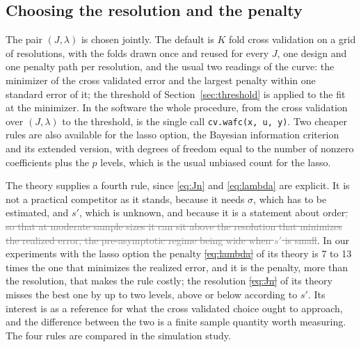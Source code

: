 \documentclass[12pt]{article} %
\theoremstyle{definition}
\theoremstyle{plain}
\newcommand{\pen}{\lambda}
\newcommand{\seff}{s'}
\begin{document}
\subsection{Choosing the resolution and the penalty}
\label{sec:tuning}

The pair $(J,\pen)$ is chosen jointly. The default is $K$ fold cross
validation on a grid of resolutions, with the folds drawn once and reused for
every $J$, one design and one penalty path per resolution, and the usual two
readings of the curve: the minimizer of the cross validated error and the
largest penalty within one standard error of it\textcolor{colR1}{; the threshold
of Section~\ref{sec:threshold} is applied to the fit at the minimizer. In the
software the whole procedure, from the cross validation over $(J,\pen)$ to the
threshold, is the single call \texttt{cv.wafc(x, u, y)}}. Two cheaper rules are also
available \textcolor{colR1}{for the lasso option}, the Bayesian information criterion and its extended version, with
degrees of freedom equal to the number of nonzero coefficients plus the $p$
levels, which is the usual unbiased count for the lasso.

The theory supplies a fourth rule, since \eqref{eq:Jn} and \eqref{eq:lambda}
are explicit. It is not a practical competitor as it stands, because it needs
$\sigma$, which has to be estimated, and $\seff$, which is unknown, and
because it is a statement about order\textcolor{gray}{\sout{, so that at moderate sample sizes it can
sit above the resolution that minimizes the realized error, the pre-asymptotic
regime being wide when $\seff$ is small}}\textcolor{colR1}{. In our experiments} \textcolor{colR1}{with the
lasso option} \textcolor{colR1}{the penalty}
\textcolor{gray}{\sout{\mbox{\eqref{eq:lambda}}}} \textcolor{colR1}{of its theory} \textcolor{colR1}{is 7 to 13 times the one that minimizes the realized error,
and it is the penalty, more than the resolution, that makes the rule costly;
the resolution}
\textcolor{gray}{\sout{\mbox{\eqref{eq:Jn}}}} \textcolor{colR1}{of its theory} \textcolor{colR1}{misses the best one by up to two levels, above
or below according to $\seff$}.
Its interest is as a reference for
what the cross validated choice ought to approach, and the difference between
the two is a finite sample quantity worth measuring. The four rules are
compared in the simulation study.
\end{document}
